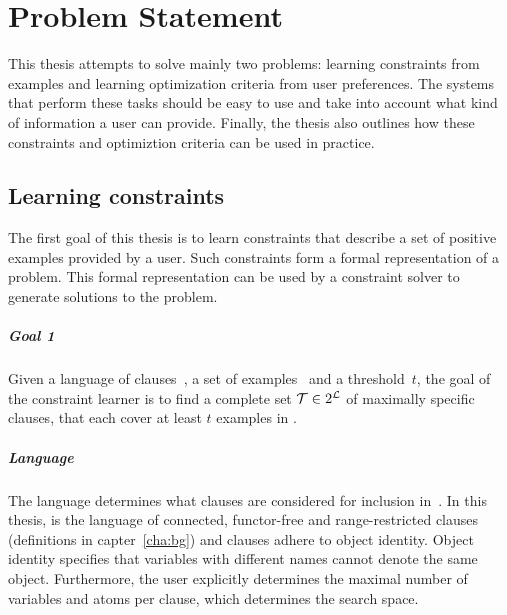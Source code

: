 \chapter{Problem Statement}
\label{cha:problem_statement}




This thesis attempts to solve mainly two problems: learning constraints from examples and learning optimization criteria from user preferences.
The systems that perform these tasks should be easy to use and take into account what kind of information a user can provide.
Finally, the thesis also outlines how these constraints and optimiztion criteria can be used in practice.

\section{Learning constraints}

The first goal of this thesis is to learn constraints that describe a set of positive examples provided by a user.
Such constraints form a formal representation of a problem.
This formal representation can be used by a constraint solver to generate solutions to the problem.

\label{sec:learning_constraints}

\begin{framed}
	\noindent
	\begin{minipage}{\textwidth}
		\paragraph{Goal 1}
		Given a language of clauses~, a set of examples~ and a threshold~$t$, the goal of the constraint learner is to find a complete set $\mathcal{T} \in 2^{\mathcal{L}}$ of maximally specific clauses, that each cover at least $t$ examples in .
	\end{minipage}
\end{framed}

\paragraph{Language}
The language  determines what clauses are considered for inclusion in~.
In this thesis,  is the language of connected, functor-free and range-restricted clauses (definitions in capter~\ref{cha:bg}) and clauses adhere to object identity.
Object identity specifies that variables with different names cannot denote the same object.
Furthermore, the user explicitly determines the maximal number of variables and atoms per clause, which determines the search space.

